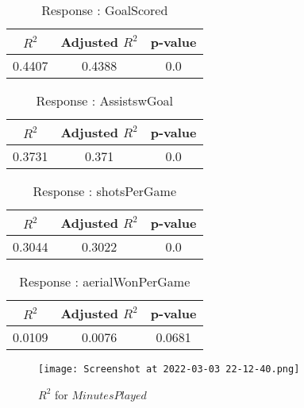 \documentclass[12pt]{article}
\begin{document}
\begin{minipage}{0.5\textwidth}
	\begin{table}[H]
	\centering
	\caption{Response : GoalScored}\label{table:1a}
	{\begin{tabular}{|c|c|c|}
			\hline
			$ R^2 $ & Adjusted $ R^2 $ & p-value \\
			\hline
			0.4407 & 0.4388 & 0.0 \\
			\hline
		\end{tabular}
	}
\end{table}
\begin{table}[H]
	\centering
	\caption{Response : AssistswGoal}\label{table:1a}
	{\begin{tabular}{|c|c|c|}
			\hline
			$ R^2 $ & Adjusted $ R^2 $ & p-value \\
			\hline
			0.3731 & 0.371 & 0.0 \\
			\hline
		\end{tabular}
	}
\end{table}
\end{minipage}
\hfill
\begin{minipage}{0.5\textwidth}
	\begin{table}[H]
	\centering
	\caption{Response : shotsPerGame }\label{table:1a}
	{\begin{tabular}{|c|c|c|}
			\hline
			$ R^2 $ & Adjusted $ R^2 $ & p-value \\
			\hline
			0.3044 & 0.3022 & 0.0 \\
			\hline
		\end{tabular}
	}
\end{table}
\begin{table}[H]
	\centering
	\caption{Response : aerialWonPerGame}\label{table:1a}
	{\begin{tabular}{|c|c|c|}
			\hline
			$ R^2 $ & Adjusted $ R^2 $ & p-value \\
			\hline
			0.0109 & 0.0076 & 0.0681 \\
			\hline
		\end{tabular}
	}
\end{table}	
\end{minipage}

\begin{figure}[H]
	\centering
	\texttt{[image: Screenshot at 2022-03-03 22-12-40.png]}
	\caption{$ R^2 $ for $ MinutesPlayed $}
	\label{fig:1}
\end{figure}
\end{document}
